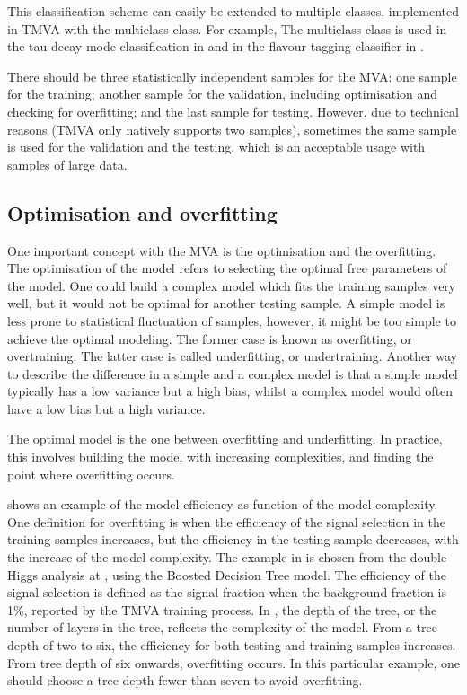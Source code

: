 This classification scheme can easily be extended to multiple classes, implemented in TMVA with the multiclass class. For example, The multiclass class is used in the tau decay mode classification in  and in the flavour tagging classifier in .

There should be three statistically independent samples for the MVA: one sample for the training; another sample for the validation, including optimisation and checking for overfitting; and the last sample for testing. However, due to technical reasons (TMVA only natively supports two samples), sometimes the same sample is used for the validation and the testing, which is an acceptable usage with samples of large data.

\subsection{Optimisation and overfitting}
\label{sec:pandoraMVAoptimisation}

One important concept with the MVA is the optimisation and the overfitting. The optimisation of the model refers to selecting the optimal free parameters of the model. One could build a complex model which fits the training samples very well, but it would not be optimal for another testing sample. A simple model is less prone to statistical fluctuation of samples, however, it might be too simple to achieve the optimal modeling. The former case is known as overfitting, or overtraining. The latter case is called underfitting, or undertraining. Another way to describe the difference in a simple and a complex model is that a simple model typically has a low variance but a high bias, whilst a complex model would often have a low bias but a high variance.

The optimal model is the one between overfitting and underfitting. In practice, this involves building the model with increasing complexities, and finding the point where overfitting occurs.


 shows an example of the model efficiency as function of the model complexity. One definition for  overfitting is when the efficiency of the signal selection in the training samples increases, but the efficiency in the testing sample decreases, with the increase of the model complexity. The example in   is chosen from the double Higgs analysis at , using the Boosted Decision Tree model. The efficiency of the signal selection is defined as the signal fraction when the background fraction is 1\%, reported by the TMVA training process. In  , the depth of the tree, or the number of layers in the tree, reflects the complexity of the model. From a tree depth of two to six, the efficiency for both testing and training samples increases. From tree depth of six onwards, overfitting occurs. In this particular example, one should choose a tree depth fewer than seven to avoid overfitting.

